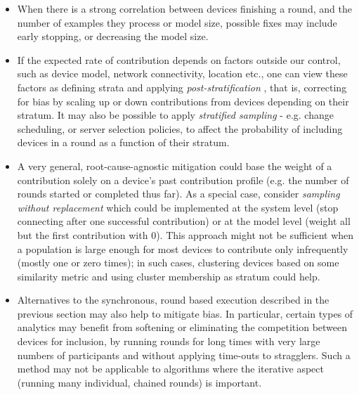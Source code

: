 \begin{itemize}
    \item When there is a strong correlation between devices finishing a round, and the number of examples they process or model size, possible fixes may include early stopping, or decreasing the model size.
    \item If the expected rate of contribution depends on factors outside our control, such as device model, network connectivity, location etc., one can view these factors as defining strata and applying \textit{post-stratification} \citep{little1993poststratification}, that is, correcting for bias by scaling up or down contributions from devices depending on their stratum. It may also be possible to apply \textit{stratified sampling} - e.g. change scheduling, or server selection policies, to affect the probability of including devices in a round as a function of their stratum.
    \item A very general, root-cause-agnostic mitigation could base the weight of a contribution solely on a device’s past contribution profile (e.g. the number of rounds started or completed thus far). As a special case, consider \textit{sampling without replacement} which could be implemented at the system level (stop connecting after one successful contribution) or at the model level (weight all but the first contribution with 0). This approach might not be sufficient when a population is large enough for most devices to contribute only infrequently (mostly one or zero times); in such cases, clustering devices based on some similarity metric and using cluster membership as stratum could help.
    \item Alternatives to the synchronous, round based execution described in the previous section may also help to mitigate bias. In particular, certain types of analytics may benefit from softening or eliminating the competition between devices for inclusion, by running rounds for long times with very large numbers of participants and without applying time-outs to stragglers. Such a method may not be applicable to algorithms where the iterative aspect (running many individual, chained rounds) is important.
\end{itemize}
    
